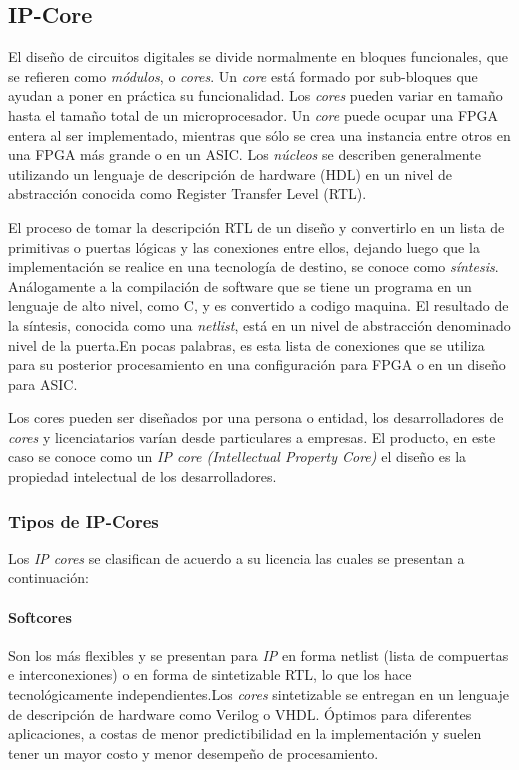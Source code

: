 	\subsection{IP-Core}
	\par
	El diseño de circuitos digitales se divide normalmente en bloques funcionales, que se refieren como \textit{módulos}, o \textit{cores}. Un
	\textit{core} está formado por sub-bloques que ayudan a poner en práctica su funcionalidad. Los \textit{cores} pueden variar en tamaño hasta el
	tamaño total de un microprocesador. Un \textit{core} puede ocupar una FPGA entera al ser implementado, mientras que sólo se crea una instancia entre
	otros en una FPGA más grande o en un ASIC. Los \textit{núcleos} se describen generalmente utilizando un lenguaje de descripción de hardware (HDL) en
	un nivel de abstracción conocida como Register Transfer Level (RTL).
	\vspace{0.5cm}
	\par
	El proceso de tomar la descripción RTL de un diseño y convertirlo en un lista de primitivas o puertas lógicas y las conexiones entre ellos, dejando
	luego que la  implementación se realice en una tecnología de destino, se conoce como \textit{síntesis}. Análogamente a la compilación de software	que
	se tiene un programa en un lenguaje de alto nivel, como C, y  es convertido a codigo maquina. El resultado de la síntesis, conocida como una
	\textit{netlist}, está en un nivel de abstracción denominado nivel de la puerta.En pocas palabras, es esta lista de conexiones que se utiliza para
	su posterior procesamiento en una configuración para FPGA o en un diseño para ASIC.
	\vspace{0.5cm}
	\par
	Los cores pueden ser diseñados por una persona o entidad, los desarrolladores de \textit{cores} y licenciatarios varían desde particulares
	a empresas. El producto, en este caso se conoce como un \textit{IP core (Intellectual Property Core)} el diseño es la propiedad intelectual de los
	desarrolladores. 
	
		\subsubsection{Tipos de IP-Cores}

		Los \textit{IP cores} se clasifican de acuerdo a su licencia las cuales se presentan a continuación:
		
			\paragraph{Softcores}
			Son los más flexibles y se presentan para \textit{IP} en forma netlist (lista de compuertas e interconexiones) o en forma de sintetizable RTL, lo
			que los hace tecnológicamente independientes.Los \textit{cores} sintetizable se entregan en un lenguaje de descripción de hardware como Verilog o
			VHDL. Óptimos para diferentes aplicaciones, a costas de menor predictibilidad en la implementación y suelen tener un mayor costo y menor desempeño
			de procesamiento.


